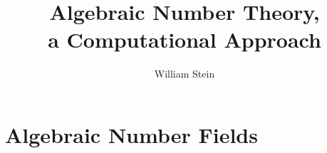 \documentclass[11pt]{book}
\title{\Huge\bf\sc Algebraic Number Theory,\\a Computational Approach}
\author{William Stein}
\begin{document}
\maketitle
\newpage
\tableofcontents
\newpage




\part{Algebraic Number Fields}



%











%
%
%
%
%
%
%
%






\label{page:end}

\newcommand{\nn}[1]{{\bf #1}}
\end{document}
